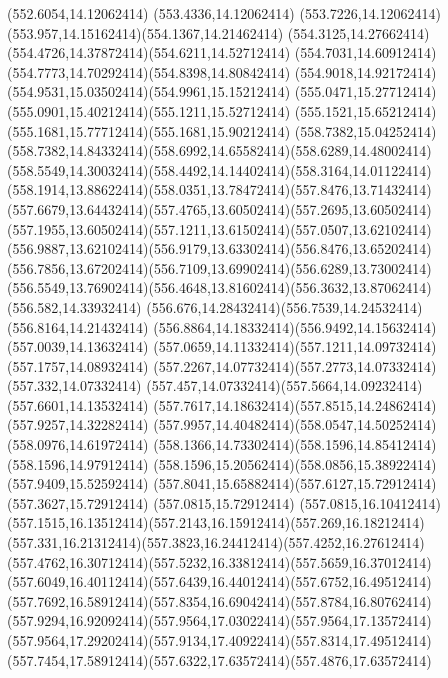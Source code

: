 {{	\lineto(552.6054,14.12062414)
	\lineto(553.4336,14.12062414)
	\curveto(553.7226,14.12062414)(553.957,14.15162414)(554.1367,14.21462414)
	\curveto(554.3125,14.27662414)(554.4726,14.37872414)(554.6211,14.52712414)
	\curveto(554.7031,14.60912414)(554.7773,14.70292414)(554.8398,14.80842414)
	\curveto(554.9018,14.92172414)(554.9531,15.03502414)(554.9961,15.15212414)
	\curveto(555.0471,15.27712414)(555.0901,15.40212414)(555.1211,15.52712414)
	\curveto(555.1521,15.65212414)(555.1681,15.77712414)(555.1681,15.90212414)
	\closepath
	\moveto(558.7382,15.04252414)
	\curveto(558.7382,14.84332414)(558.6992,14.65582414)(558.6289,14.48002414)
	\curveto(558.5549,14.30032414)(558.4492,14.14402414)(558.3164,14.01122414)
	\curveto(558.1914,13.88622414)(558.0351,13.78472414)(557.8476,13.71432414)
	\curveto(557.6679,13.64432414)(557.4765,13.60502414)(557.2695,13.60502414)
	\curveto(557.1955,13.60502414)(557.1211,13.61502414)(557.0507,13.62102414)
	\curveto(556.9887,13.62102414)(556.9179,13.63302414)(556.8476,13.65202414)
	\curveto(556.7856,13.67202414)(556.7109,13.69902414)(556.6289,13.73002414)
	\curveto(556.5549,13.76902414)(556.4648,13.81602414)(556.3632,13.87062414)
	\lineto(556.582,14.33932414)
	\curveto(556.676,14.28432414)(556.7539,14.24532414)(556.8164,14.21432414)
	\curveto(556.8864,14.18332414)(556.9492,14.15632414)(557.0039,14.13632414)
	\curveto(557.0659,14.11332414)(557.1211,14.09732414)(557.1757,14.08932414)
	\curveto(557.2267,14.07732414)(557.2773,14.07332414)(557.332,14.07332414)
	\curveto(557.457,14.07332414)(557.5664,14.09232414)(557.6601,14.13532414)
	\curveto(557.7617,14.18632414)(557.8515,14.24862414)(557.9257,14.32282414)
	\curveto(557.9957,14.40482414)(558.0547,14.50252414)(558.0976,14.61972414)
	\curveto(558.1366,14.73302414)(558.1596,14.85412414)(558.1596,14.97912414)
	\curveto(558.1596,15.20562414)(558.0856,15.38922414)(557.9409,15.52592414)
	\curveto(557.8041,15.65882414)(557.6127,15.72912414)(557.3627,15.72912414)
	\lineto(557.0815,15.72912414)
	\lineto(557.0815,16.10412414)
	\curveto(557.1515,16.13512414)(557.2143,16.15912414)(557.269,16.18212414)
	\curveto(557.331,16.21312414)(557.3823,16.24412414)(557.4252,16.27612414)
	\curveto(557.4762,16.30712414)(557.5232,16.33812414)(557.5659,16.37012414)
	\curveto(557.6049,16.40112414)(557.6439,16.44012414)(557.6752,16.49512414)
	\curveto(557.7692,16.58912414)(557.8354,16.69042414)(557.8784,16.80762414)
	\curveto(557.9294,16.92092414)(557.9564,17.03022414)(557.9564,17.13572414)
	\curveto(557.9564,17.29202414)(557.9134,17.40922414)(557.8314,17.49512414)
	\curveto(557.7454,17.58912414)(557.6322,17.63572414)(557.4876,17.63572414)
}}
